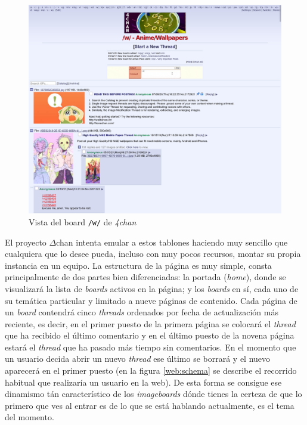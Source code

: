 \documentclass[12pt,a4paper,titlepage]{article}
\newcommand\projectname{$\Delta$chan}
\begin{document}
    \begin{figure}[ht]
        \centering
        \caption{Vista del board \texttt{/w/} de \textit{4chan}}\bigskip
        \label{4chan:board}
        \includegraphics[width=1.0\textwidth]{media/4chan-board.png}
    \end{figure}

    El proyecto {\projectname} intenta emular a estos tablones haciendo muy sencillo que cualquiera que lo desee pueda, incluso con muy pocos recursos, montar su propia instancia en un equipo. La estructura de la página es muy simple, consta principalmente de dos partes bien diferenciadas: la portada (\textit{home}), donde se visualizará la lista de \textit{boards} activos en la página; y los \textit{boards} en sí, cada uno de su temática particular y limitado a nueve páginas de contenido. Cada página de un \textit{board} contendrá cinco \textit{threads} ordenados por fecha de actualización más reciente, es decir, en el primer puesto de la primera página se colocará el \textit{thread} que ha recibido el último comentario y en el último puesto de la novena página estará el \textit{thread} que ha pasado más tiempo sin comentarios. En el momento que un usuario decida abrir un nuevo \textit{thread} ese último se borrará y el nuevo aparecerá en el primer puesto (en la figura \ref{web:schema} se describe el recorrido habitual que realizaría un usuario en la web). De esta forma se consigue ese dinamismo tán característico de los \textit{imageboards} dónde tienes la certeza de que lo primero que ves al entrar es de lo que se está hablando actualmente, es el tema del momento.
\end{document}
